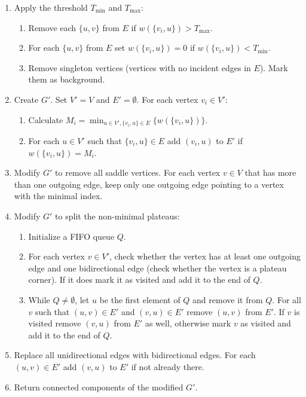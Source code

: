 \documentclass{article}\usepackage{times}
\begin{document}
\begin{enumerate}
\item Apply the threshold $T_{\min}$ and $T_{\max}$:
  \begin{enumerate}
  \item Remove each $\{u,v\}$ from $E$ if $w(\{v_i,u\}) > T_{\max}$.
  \item For each $\{u,v\}$ from $E$ set $w(\{v_i,u\}) = 0$ if
    $w(\{v_i,u\}) < T_{\min}$.
  \item Remove singleton vertices (vertices with no incident edges in
    $E$). Mark them as background.
  \end{enumerate}
\item Create $G'$. Set $V'=V$ and $E'=\emptyset$. For each vertex $v_i
  \in V'$:
  \begin{enumerate}
  \item Calculate $M_i = \min_{u \in V', \{v_i,u\} \in
    E}\{w(\{v_i,u\})\}$.
  \item For each $u \in V'$ such that $\{v_i,u\} \in E$ add $(v_i,u)$
    to $E'$ if $w(\{v_i,u\})=M_i$.
  \end{enumerate}
\item Modify $G'$ to remove all saddle vertices. For each vertex $v
  \in V$ that has more than one outgoing edge, keep only one outgoing
  edge pointing to a vertex with the minimal index.
\item Modify $G'$ to split the non-minimal plateaus:
  \begin{enumerate}
  \item Initialize a FIFO queue $Q$.
  \item For each vertex $v \in V'$, check whether the vertex has at
    least one outgoing edge and one bidirectional edge (check whether
    the vertex is a plateau corner). If it does mark it as visited and
    add it to the end of $Q$.
  \item While $Q \neq \emptyset$, let $u$ be the first element of $Q$
    and remove it from $Q$. For all $v$ such that $(u,v) \in E'$ and
    $(v,u) \in E'$ remove $(u,v)$ from $E'$. If $v$ is visited remove
    $(v,u)$ from $E'$ as well, otherwise mark $v$ as visited and add
    it to the end of $Q$.
  \end{enumerate}
\item Replace all unidirectional edges with bidirectional edges. For
  each $(u,v) \in E'$ add $(v,u)$ to $E'$ if not already there.
\item Return connected components of the modified $G'$.
\end{enumerate}
\end{document}
